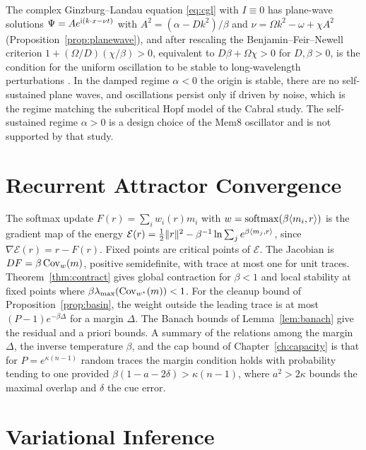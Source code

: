 The complex Ginzburg--Landau equation \eqref{eq:cgl} with $I\equiv0$ has plane-wave solutions $\Psi=Ae^{\mathrm{i}(k\cdot x-\nu t)}$ with $A^2=(\alpha-Dk^2)/\beta$ and $\nu=\Omega k^2-\omega+\chi A^2$ (Proposition~\ref{prop:planewave}), and after rescaling the Benjamin--Feir--Newell criterion $1+(\Omega/D)(\chi/\beta)>0$, equivalent to $D\beta+\Omega\chi>0$ for $D,\beta>0$, is the condition for the uniform oscillation to be stable to long-wavelength perturbations \cite{aranson2002}. In the damped regime $\alpha<0$ the origin is stable, there are no self-sustained plane waves, and oscillations persist only if driven by noise, which is the regime matching the subcritical Hopf model of the Cabral study. The self-sustained regime $\alpha>0$ is a design choice of the Mem8 oscillator and is not supported by that study.

\chapter{Recurrent Attractor Convergence}\label{app:attractor}

The softmax update $F(r)=\sum_iw_i(r)m_i$ with $w=\operatorname{softmax}(\beta\langle m_i,r\rangle)$ is the gradient map of the energy $\mathcal E(r)=\tfrac12\lVert r\rVert^2-\beta^{-1}\ln\sum_je^{\beta\langle m_j,r\rangle}$, since $\nabla\mathcal E(r)=r-F(r)$. Fixed points are critical points of $\mathcal E$. The Jacobian is $DF=\beta\operatorname{Cov}_w(m)$, positive semidefinite, with trace at most one for unit traces. Theorem~\ref{thm:contract} gives global contraction for $\beta<1$ and local stability at fixed points where $\beta\lambda_{\max}(\operatorname{Cov}_{w^\star}(m))<1$. For the cleanup bound of Proposition~\ref{prop:basin}, the weight outside the leading trace is at most $(P-1)e^{-\beta\Delta}$ for a margin $\Delta$. The Banach bounds of Lemma~\ref{lem:banach} give the residual and a priori bounds. A summary of the relations among the margin $\Delta$, the inverse temperature $\beta$, and the cap bound of Chapter~\ref{ch:capacity} is that for $P=e^{\kappa(n-1)}$ random traces the margin condition holds with probability tending to one provided $\beta(1-a-2\delta)>\kappa(n-1)$, where $a^2>2\kappa$ bounds the maximal overlap and $\delta$ the cue error.

\chapter{Variational Inference}\label{app:var}

